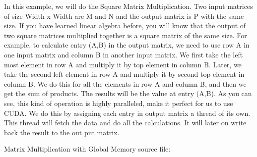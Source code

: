 \documentclass[letterpaper,10pt,openany,oneside]{sphinxmanual}
\begin{document}
In this example, we will do the Square Matrix Multiplication. Two input matrices of size Width x Width are M and N and the output matrix is P with the same size. If you have learned linear algebra before, you will know that the output of two square matrices multiplied together is a square matrix of the same size. For example, to calculate entry (A,B) in the output matrix, we need to use row A in one input matrix and column B in another input matrix. We first take the left most element in row A and multiply it by top element in column B. Later, we take the second left element in row A and multiply it by second top element in column B. We do this for all the elements in row A and column B, and then we get the sum of products. The results will be the value at entry (A,B). As you can see, this kind of operation is highly paralleled, make it perfect for us to use CUDA. We do this by assigning each entry in output matrix a thread of its own. This thread will fetch the data and do all the calculations. It will later on write back the result to the out put matrix.

Matrix Multiplication with Global Memory source file:
\end{document}
